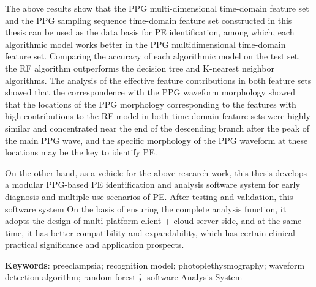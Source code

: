 The above results show that the PPG multi-dimensional time-domain feature set and the PPG sampling sequence time-domain feature set constructed in this thesis 
can be used as the data basis for PE identification, among which, each algorithmic model works better in the PPG multidimensional time-domain feature set.
Comparing the accuracy of each algorithmic model on the test set, the RF algorithm outperforms 
the decision tree and K-nearest neighbor algorithms. The analysis of the effective feature contributions in both feature sets showed that the correspondence 
with the PPG waveform morphology showed that the locations of the PPG morphology corresponding to the features with high contributions to the RF 
model in both time-domain feature sets were highly similar and concentrated near the end of the descending branch after the peak of the main PPG wave, 
and the specific morphology of the PPG waveform at these locations may be the key to identify PE.

On the other hand, as a vehicle for the above research work, this thesis develops a modular PPG-based PE identification and analysis 
software system for early diagnosis and multiple use scenarios of PE. After testing and validation, this software system
On the basis of ensuring the complete analysis function, it adopts the design of multi-platform client + cloud server side, 
and at the same time, it has better compatibility and expandability, which has certain clinical practical significance and application 
prospects.

\vspace{2em}

\textbf{Keywords}: preeclampsia; recognition model; photoplethysmography; waveform detection algorithm; random forest；
software Analysis System